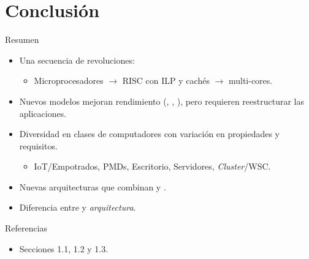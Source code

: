 \section{Conclusión}

\begin{frame}[t]{Resumen}
\begin{itemize}
  \item Una secuencia de revoluciones:
    \begin{itemize}
      \item Microprocesadores $\rightarrow$ RISC con ILP y cachés $\rightarrow$ multi-cores.
    \end{itemize}

  \item Nuevos modelos mejoran rendimiento (, , ), 
        pero requieren reestructurar las aplicaciones.

  \item Diversidad en clases de computadores con variación en propiedades y requisitos.
    \begin{itemize}
      \item IoT/Empotrados, PMDs, Escritorio, Servidores, \emph{Cluster}/WSC.
    \end{itemize}

  \item Nuevas arquitecturas que combinan  y .

  \item Diferencia entre  y \emph{arquitectura}.
\end{itemize}
\end{frame}

\begin{frame}[t]{Referencias}
\begin{itemize}
  \item \bibhennessy
  Secciones 1.1, 1.2 y 1.3.

\end{itemize}
\end{frame}
